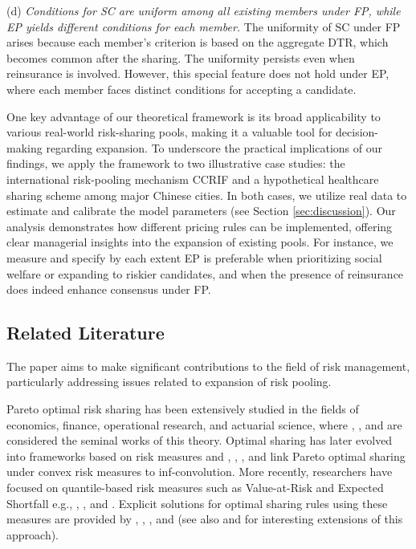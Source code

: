 \documentclass[fleqn,mnsc,nonblindrev]{informs4}
\begin{document}
(d) {\it Conditions for SC are uniform among all existing members under FP, while EP yields different conditions for each member.}  The uniformity of SC under FP arises because each member's criterion is based on the aggregate DTR, which becomes common after the sharing. The uniformity persists even when reinsurance is involved. However, this special feature does not hold under EP, where each member faces distinct conditions for accepting a candidate.

   {One key advantage of our theoretical framework is its broad applicability to various real-world risk-sharing pools, making it a valuable tool for decision-making regarding expansion. To underscore the practical implications of our findings, we apply the framework to two illustrative case studies: the international risk-pooling mechanism CCRIF and a hypothetical healthcare sharing scheme among major Chinese cities. In both cases, we utilize real data to estimate and calibrate the model parameters (see Section \ref{sec:discussion}). Our analysis demonstrates how different pricing rules can be implemented, offering clear managerial insights into the expansion of existing pools. For instance, we measure and specify by each extent EP is preferable when prioritizing social welfare or expanding to riskier candidates, and when the presence of reinsurance does indeed enhance consensus under FP.}

\subsection{Related Literature}\label{sec:literature}

The paper aims to make significant contributions to the field of risk management, particularly addressing issues related to    {expansion of} risk pooling.


Pareto optimal risk sharing has been extensively studied in the fields of economics, finance, operational research, and actuarial science, where  \cite{borch1962equilibrium}, \cite{gerber1978pareto}, and \cite{buhlmann1979optimal} are considered the seminal works of this theory. Optimal sharing has later evolved into frameworks based on risk measures and \cite{barrieu2005inf}, \cite{jouini2008optimal}, \cite{filipovic2008optimal}, \cite{dana2010overlapping} and \cite{righi2022inf} link Pareto optimal sharing under convex risk measures to inf-convolution. More recently, researchers have focused on quantile-based risk measures such as Value-at-Risk and Expected Shortfall e.g., \cite{AllTurTan12}, \cite{AdrBru16}, and \cite{AchPedPhiRich16}. Explicit solutions for optimal sharing rules using these measures are provided by \cite{cai2017pareto}, \cite{embrechts2018quantile}, \cite{embrechts2020quantile}, and \cite{liu2022inf} (see also \cite{liu2024risk} and \cite{castagnoli2022star} for interesting extensions of this approach).  
\end{document}
